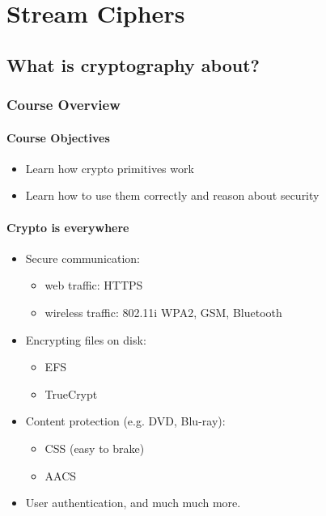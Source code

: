 \documentclass[12pt]{book}
\begin{document}
\tableofcontents
\chapter{Stream Ciphers}
\section{What is cryptography about?}
\subsection{Course Overview}
\subsubsection{Course Objectives}
\begin{itemize}
	\item Learn how crypto primitives work
	\item Learn how to use them correctly and reason about security
\end{itemize}

\subsubsection{Crypto is everywhere}
\begin{itemize}
	\item Secure communication:
	\begin{itemize}
		\item web traffic: HTTPS
		\item wireless traffic: 802.11i WPA2, GSM, Bluetooth
	\end{itemize}
	
	\item Encrypting files on disk:
	\begin{itemize}
		\item EFS
		\item TrueCrypt
	\end{itemize}
	
	\item Content protection (e.g. DVD, Blu-ray):
	\begin{itemize}
		\item CSS (easy to brake)
		\item AACS
	\end{itemize}
	
	\item User authentication, and much much more.
\end{itemize}
\end{document}
